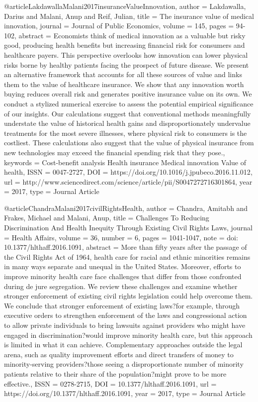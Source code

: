 @article{LakdawallaMalani2017insuranceValueInnovation,
   author = {Lakdawalla, Darius and Malani, Anup and Reif, Julian},
   title = {The insurance value of medical innovation},
   journal = {Journal of Public Economics},
   volume = {145},
   pages = {94-102},
   abstract = {Economists think of medical innovation as a valuable but risky good, producing health benefits but increasing financial risk for consumers and healthcare payers. This perspective overlooks how innovation can lower physical risks borne by healthy patients facing the prospect of future disease. We present an alternative framework that accounts for all these sources of value and links them to the value of healthcare insurance. We show that any innovation worth buying reduces overall risk and generates positive insurance value on its own. We conduct a stylized numerical exercise to assess the potential empirical significance of our insights. Our calculations suggest that conventional methods meaningfully understate the value of historical health gains and disproportionately undervalue treatments for the most severe illnesses, where physical risk to consumers is the costliest. These calculations also suggest that the value of physical insurance from new technologies may exceed the financial spending risk that they pose.},
   keywords = {Cost-benefit analysis
Health insurance
Medical innovation
Value of health},
   ISSN = {0047-2727},
   DOI = {https://doi.org/10.1016/j.jpubeco.2016.11.012},
   url = {http://www.sciencedirect.com/science/article/pii/S0047272716301864},
   year = {2017},
   type = {Journal Article}
}

@article{ChandraMalani2017civilRightsHealth,
   author = {Chandra, Amitabh and Frakes, Michael and Malani, Anup},
   title = {Challenges To Reducing Discrimination And Health Inequity Through Existing Civil Rights Laws},
   journal = {Health Affairs},
   volume = {36},
   number = {6},
   pages = {1041-1047},
   note = {doi: 10.1377/hlthaff.2016.1091},
   abstract = {More than fifty years after the passage of the Civil Rights Act of 1964, health care for racial and ethnic minorities remains in many ways separate and unequal in the United States. Moreover, efforts to improve minority health care face challenges that differ from those confronted during de jure segregation. We review these challenges and examine whether stronger enforcement of existing civil rights legislation could help overcome them. We conclude that stronger enforcement of existing laws?for example, through executive orders to strengthen enforcement of the laws and congressional action to allow private individuals to bring lawsuits against providers who might have engaged in discrimination?would improve minority health care, but this approach is limited in what it can achieve. Complementary approaches outside the legal arena, such as quality improvement efforts and direct transfers of money to minority-serving providers?those seeing a disproportionate number of minority patients relative to their share of the population?might prove to be more effective.},
   ISSN = {0278-2715},
   DOI = {10.1377/hlthaff.2016.1091},
   url = {https://doi.org/10.1377/hlthaff.2016.1091},
   year = {2017},
   type = {Journal Article}
}

